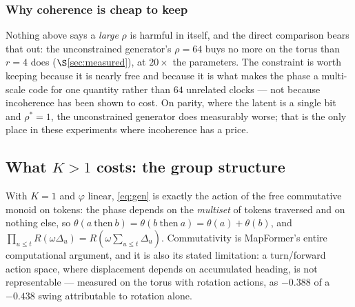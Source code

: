 \documentclass[11pt]{article}
\begin{document}
\subsubsection*{Why coherence is cheap to keep}

Nothing above says a \emph{large} $\rho$ is harmful in itself, and the direct
comparison bears that out: the unconstrained generator's $\rho = 64$ buys no more
on the torus than $r=4$ does ($\S$\ref{sec:measured}), at $20\times$ the parameters. The
constraint is worth keeping because it is nearly free and because it is what makes
the phase a multi-scale code for one quantity rather than $64$ unrelated clocks
--- not because incoherence has been shown to cost. On parity, where the latent is
a single bit and $\rho^{*}=1$, the unconstrained generator does measurably worse;
that is the only place in these experiments where incoherence has a price.

\subsection{What $K > 1$ costs: the group structure}
\label{sec:group}

With $K=1$ and $\varphi$ linear, \eqref{eq:gen} is exactly the action of the free
commutative monoid on tokens: the phase depends on the \emph{multiset} of tokens
traversed and on nothing else, so
$\theta(a\ \text{then}\ b) = \theta(b\ \text{then}\ a) = \theta(a)+\theta(b)$, and
$\prod_{u\le t}R(\omega\Delta_u) = R(\omega\sum_{u\le t}\Delta_u)$. Commutativity
is MapFormer's entire computational argument, and it is also its stated limitation:
a turn/forward action space, where displacement depends on accumulated heading, is
not representable --- measured on the torus with rotation actions, as $-0.388$ of a $-0.438$ swing
attributable to rotation alone.
\end{document}
